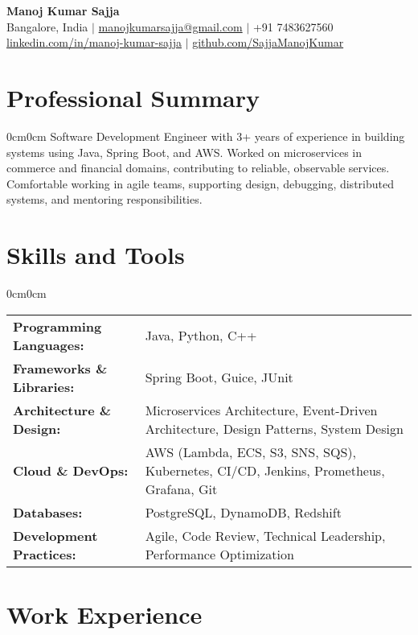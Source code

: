 \documentclass[8.5pt, letterpaper]{article}
\newenvironment{onecolentry}{\begin{adjustwidth}{0cm}{0cm}\vspace{0.5pt}}{\end{adjustwidth}\vspace{1.5pt}}
\begin{document}
    \begin{center}
{\Large \textbf{Manoj Kumar Sajja}} \\[0.1cm]
\small
Bangalore, India \quad $\vert$ \quad
\href{mailto:manojkumarsajja@gmail.com}{manojkumarsajja@gmail.com} \quad $\vert$ \quad
+91 7483627560 \\[0.03cm]
\href{https://linkedin.com/in/manoj-kumar-sajja}{linkedin.com/in/manoj-kumar-sajja} \quad $\vert$ \quad
\href{https://github.com/SajjaManojKumar}{github.com/SajjaManojKumar}
\end{center}

\section{Professional Summary}
\begin{onecolentry}
Software Development Engineer with 3+ years of experience in building systems using Java, Spring Boot, and AWS. Worked on microservices in commerce and financial domains, contributing to reliable, observable services. Comfortable working in agile teams, supporting design, debugging, distributed systems, and mentoring responsibilities.
\end{onecolentry}

\section{Skills and Tools}
\begin{onecolentry}
\begin{tabularx}{\linewidth}{@{}lX@{}}
\textbf{Programming Languages:} & Java, Python, C++ \\
\textbf{Frameworks \& Libraries:} & Spring Boot, Guice, JUnit \\
\textbf{Architecture \& Design:} & Microservices Architecture, Event-Driven Architecture, Design Patterns, System Design \\
\textbf{Cloud \& DevOps:} & AWS (Lambda, ECS, S3, SNS, SQS), Kubernetes, CI/CD, Jenkins, Prometheus, Grafana, Git \\
\textbf{Databases:} & PostgreSQL, DynamoDB, Redshift \\
\textbf{Development Practices:} & Agile, Code Review, Technical Leadership, Performance Optimization \\
\end{tabularx}
\end{onecolentry}

\section{Work Experience}
\end{document}
